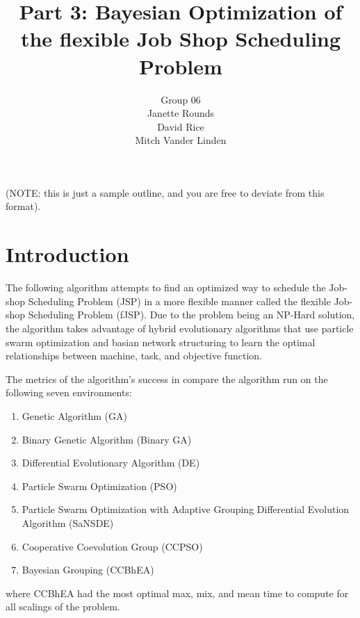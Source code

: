 \documentclass[11pt]{article}
\title{Part 3: Bayesian Optimization of the flexible Job Shop Scheduling Problem}
\author{Group 06 \\ 
\small Janette Rounds \\ \small David Rice \\ \small Mitch Vander Linden}
\begin{document}
\maketitle

(NOTE: this is just a sample outline, and you are free to deviate from this 
format).

\section{Introduction}
The following algorithm attempts to find an optimized way to schedule the Job-shop Scheduling Problem (JSP) in a more flexible manner called the flexible Job-shop Scheduling Problem (fJSP). Due to the problem being an NP-Hard solution, the algorithm takes advantage of hybrid evolutionary algorithms that use particle swarm optimization and basian network structuring to learn the optimal relationships between machine, task, and objective function. 

The metrics of the algorithm's success in \cite{sun2015bayesian} compare the algorithm run on the following seven environments:
\begin{enumerate}
	\item Genetic Algorithm (GA)
	\item Binary Genetic Algorithm (Binary GA)
	\item Differential Evolutionary Algorithm (DE)
	\item Particle Swarm Optimization (PSO)
	\item Particle Swarm Optimization with Adaptive Grouping Differential Evolution Algorithm (SaNSDE)
	\item Cooperative Coevolution Group (CCPSO)
	\item Bayesian Grouping (CCBhEA) 
\end{enumerate}
where CCBhEA had the most optimal max, mix, and mean time to compute for all scalings of the problem.
\end{document}
